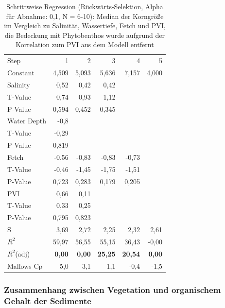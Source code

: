 \begin{table}[!htb]
\centering
\caption[Schrittweise Regression: Median der Korngröße im Vergleich zu 4 Prädikatoren]{Schrittweise Regression (Rückwärts-Selektion, Alpha für Abnahme: 0,1, N = 6-10): Median der Korngröße im Vergleich zu Salinität, Wassertiefe, Fetch und PVI, die Bedeckung mit Phytobenthos wurde aufgrund der Korrelation zum PVI aus dem Modell entfernt}
\begin{tabular}{lrrrrr}

\toprule

Step    &        1 &     2   &   3    &  4    &  5\\
Constant &   4,509 & 5,093 & 5,636 & 7,157 & 4,000\\
\midrule

Salinity       &   0,52 &  0,42  & 0,42\\
T-Value    &  0,74  & 0,93 &  1,12\\
P-Value   &  0,594 & 0,452 & 0,345\\
\midrule
Water Depth     &   -0,8\\
T-Value   &  -0,29\\
P-Value   &  0,819\\
\midrule
Fetch       &  -0,56 & -0,83 & -0,83 & -0,73\\
T-Value   &  -0,46 & -1,45 & -1,75 & -1,51\\
P-Value   &  0,723 & 0,283 & 0,179 & 0,205\\
\midrule
PVI          &  0,66  & 0,11\\
T-Value     &0,33  & 0,25\\
P-Value     &0,795 & 0,823\\
\midrule
\midrule
S           & 3,69  & 2,72 &  2,25 &  2,32  & 2,61\\
$R^2$        &59,97 & 56,55 & 55,15 & 36,43  & -0,00\\
$R^2$(adj)    &\textbf{0,00}  & \textbf{0,00} & \textbf{25,25} & \textbf{20,54}   & \textbf{0,00}\\
Mallows Cp    &5,0    &3,1  &  1,1 &  -0,4   &-1,5\\
\bottomrule

\end{tabular}
\label{tab:spearman_rank_correlations}
\end{table}




\subsubsection{Zusammenhang zwischen Vegetation und organischem Gehalt der Sedimente}

